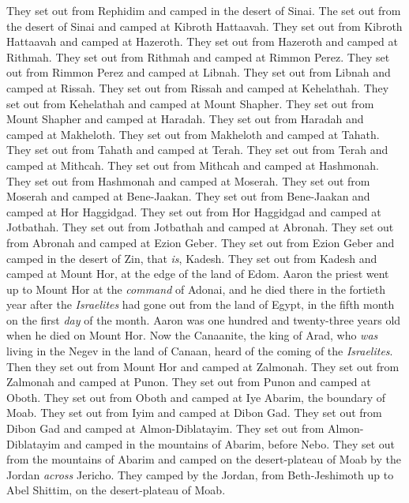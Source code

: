 \begin{biblechapter}
\verse They set out from Rephidim and camped in the desert of Sinai.
\verse The set out from the desert of Sinai and camped at Kibroth Hattaavah.
\verse They set out from Kibroth Hattaavah and camped at Hazeroth.
\verse They set out from Hazeroth and camped at Rithmah.
\verse They set out from Rithmah and camped at Rimmon Perez.
\verse They set out from Rimmon Perez and camped at Libnah.
\verse They set out from Libnah and camped at Rissah.
\verse They set out from Rissah and camped at Kehelathah.
\verse They set out from Kehelathah and camped at Mount Shapher.
\verse They set out from Mount Shapher and camped at Haradah.
\verse They set out from Haradah and camped at Makheloth.
\verse They set out from Makheloth and camped at Tahath.
\verse They set out from Tahath and camped at Terah.
\verse They set out from Terah and camped at Mithcah.
\verse They set out from Mithcah and camped at Hashmonah.
\verse They set out from Hashmonah and camped at Moserah.
\verse They set out from Moserah and camped at Bene-Jaakan.
\verse They set out from Bene-Jaakan and camped at Hor Haggidgad.
\verse They set out from Hor Haggidgad and camped at Jotbathah.
\verse They set out from Jotbathah and camped at Abronah.
\verse They set out from Abronah and camped at Ezion Geber.
\verse They set out from Ezion Geber and camped in the desert of Zin, that \textit{is}, Kadesh.
\verse They set out from Kadesh and camped at Mount Hor, at the edge of the land of Edom.
\verse Aaron the priest went up to Mount Hor at the \textit{command} of Adonai, and he died there in the fortieth year after the \textit{Israelites} had gone out from the land of Egypt, in the fifth month on the first \textit{day} of the month.
\verse Aaron was one hundred and twenty-three years old when he died on Mount Hor.
\verse Now the Canaanite, the king of Arad, who \textit{was} living in the Negev in the land of Canaan, heard of the coming of the \textit{Israelites}.
\verse Then they set out from Mount Hor and camped at Zalmonah.
\verse They set out from Zalmonah and camped at Punon.
\verse They set out from Punon and camped at Oboth.
\verse They set out from Oboth and camped at Iye Abarim, the boundary of Moab.
\verse They set out from Iyim and camped at Dibon Gad.
\verse They set out from Dibon Gad and camped at Almon-Diblatayim.
\verse They set out from Almon-Diblatayim and camped in the mountains of Abarim, before Nebo.
\verse They set out from the mountains of Abarim and camped on the desert-plateau of Moab by the Jordan \textit{across} Jericho.
\verse They camped by the Jordan, from Beth-Jeshimoth up to Abel Shittim, on the desert-plateau of Moab.

\end{biblechapter}
